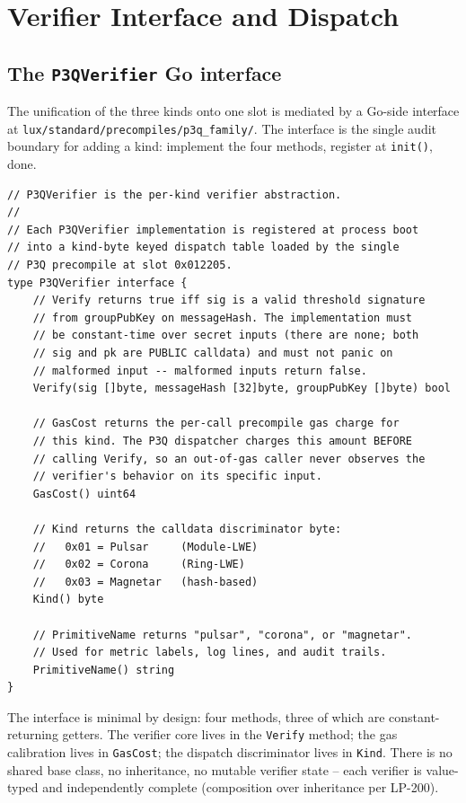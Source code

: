 \section{Verifier Interface and Dispatch}
\label{sec:verifier-interface}

\subsection{The \texttt{P3QVerifier} Go interface}

The unification of the three kinds onto one slot is mediated by
a Go-side interface at
\texttt{lux/standard/precompiles/p3q\_family/}. The interface is
the single audit boundary for adding a kind: implement the four
methods, register at \texttt{init()}, done.

\begin{lstlisting}[language={}]
// P3QVerifier is the per-kind verifier abstraction.
//
// Each P3QVerifier implementation is registered at process boot
// into a kind-byte keyed dispatch table loaded by the single
// P3Q precompile at slot 0x012205.
type P3QVerifier interface {
    // Verify returns true iff sig is a valid threshold signature
    // from groupPubKey on messageHash. The implementation must
    // be constant-time over secret inputs (there are none; both
    // sig and pk are PUBLIC calldata) and must not panic on
    // malformed input -- malformed inputs return false.
    Verify(sig []byte, messageHash [32]byte, groupPubKey []byte) bool

    // GasCost returns the per-call precompile gas charge for
    // this kind. The P3Q dispatcher charges this amount BEFORE
    // calling Verify, so an out-of-gas caller never observes the
    // verifier's behavior on its specific input.
    GasCost() uint64

    // Kind returns the calldata discriminator byte:
    //   0x01 = Pulsar     (Module-LWE)
    //   0x02 = Corona     (Ring-LWE)
    //   0x03 = Magnetar   (hash-based)
    Kind() byte

    // PrimitiveName returns "pulsar", "corona", or "magnetar".
    // Used for metric labels, log lines, and audit trails.
    PrimitiveName() string
}
\end{lstlisting}

The interface is minimal by design: four methods, three of which
are constant-returning getters. The verifier core lives in the
\texttt{Verify} method; the gas calibration lives in
\texttt{GasCost}; the dispatch discriminator lives in
\texttt{Kind}. There is no shared base class, no inheritance, no
mutable verifier state -- each verifier is value-typed and
independently complete (composition over inheritance per
LP-200).

